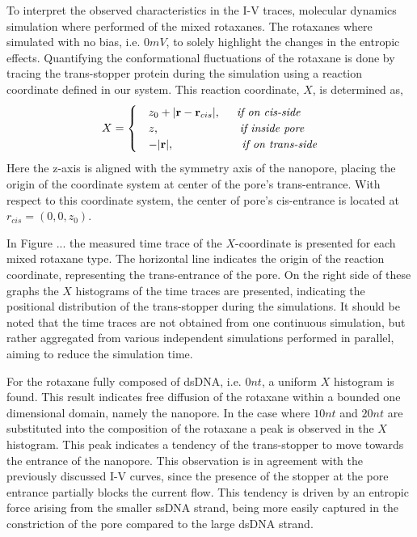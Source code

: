 To interpret the observed characteristics in the I-V traces, molecular dynamics
simulation where performed of the mixed rotaxanes. The rotaxanes where simulated with no
bias, i.e. $0 mV$, to solely highlight the changes in the entropic effects. Quantifying
the conformational fluctuations of the rotaxane is done by tracing the trans-stopper
protein during the simulation using a reaction coordinate defined in our system. This
reaction coordinate, $X$, is determined as,
\begin{equation}
  X = \begin{cases}
        &z_0 + |\textbf{r} - \textbf{r}_{cis}|, \hspace{0.5cm} \textit{if on cis-side}\\
        &z, \hspace{2.5cm} \textit{if inside pore}\\
        &-|\textbf{r}|, \hspace{2.11cm} \textit{if on trans-side}
      \end{cases}
\end{equation}
Here the z-axis is aligned with the symmetry axis of the nanopore, placing the origin of
the coordinate system at center of the pore's trans-entrance. With respect to this
coordinate system, the center of pore's cis-entrance is located at $r_{cis} = (0,0,z_0)$.

In Figure ... the measured time trace of the $X$-coordinate is presented for each mixed
rotaxane type.  The horizontal line indicates the origin of the reaction coordinate,
representing the trans-entrance of the pore. On the right side of these graphs the $X$
histograms of the time traces are presented, indicating the positional distribution of
the trans-stopper during the simulations. It should be noted that the time traces are not
obtained from one continuous simulation, but rather aggregated from various independent
simulations performed in parallel, aiming to reduce the simulation time.

For the rotaxane fully composed of dsDNA, i.e. $0nt$, a uniform  $X$  histogram is found.
This result indicates free diffusion of the rotaxane within a bounded one dimensional
domain, namely the nanopore. In the case where $10nt$ and $20nt$ are substituted into the
composition of the rotaxane a peak is observed in the $X$ histogram. This peak indicates
a tendency of the trans-stopper to move towards the entrance of the nanopore. This
observation is in agreement with the previously discussed I-V curves, since the presence
of the stopper at the pore entrance partially blocks the current flow. This tendency
is driven by an entropic force arising from the smaller ssDNA strand, being more easily
captured in the constriction of the pore compared to the large dsDNA strand.


